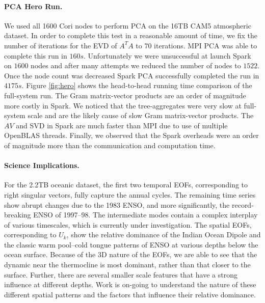 \paragraph{PCA Hero Run.}
We used all 1600 Cori nodes to perform PCA on the 16TB CAM5 atmospheric dataset. In order to complete this test in a reasonable amount of time, we fix  the number of iterations for the EVD of $A^TA$ to $70$ iterations. MPI PCA was able to complete this run in $160s$. Unfortunately we were unsuccessful at launch Spark on $1600$ nodes and after many attempts we reduced the number of nodes to $1522$. Once the node count was decreased Spark PCA successfully completed the run in $4175s$. Figure \ref{fig:hero} shows the head-to-head running time comparison of the full-system run. The Gram matrix-vector products are an order of magnitude more costly in Spark. We noticed that the tree-aggregates were very slow at full-system scale and are the likely cause of slow Gram matrix-vector products. The $AV$ and SVD in Spark are much faster than MPI due to use of multiple OpenBLAS threads. Finally, we observed that the Spark overheads were an order of magnitude more than the communication and computation time.

\paragraph{Science Implications.}
For the 2.2TB oceanic dataset, the first two temporal EOFs, {corresponding to right singular vectors}, fully capture the annual cycles. The remaining time series show abrupt changes due to the 1983 ENSO, and more significantly, the record-breaking ENSO of 1997--98. The intermediate modes contain a complex interplay of various timescales, which is currently under investigation. The spatial EOFs, corresponding to $U_k$, show the relative dominance of the Indian Ocean Dipole and the classic warm pool--cold tongue patterns of ENSO at various depths below the ocean surface. Because of the 3D nature of the EOFs, we are able to see that the dynamic near the thermocline is most dominant, rather than that closer to the surface. Further, there are several smaller scale features that have a strong influence at different depths. Work is on-going to understand the nature of these different spatial patterns and the factors that influence their relative dominance.
 
